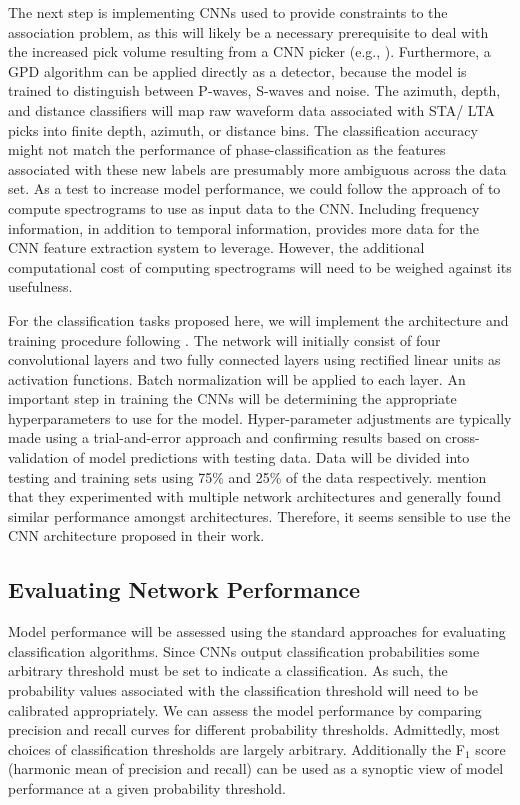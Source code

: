\documentclass[12p]{article}
\begin{document}
The next step is implementing CNNs used to provide constraints to the association problem, as this will likely be a
necessary prerequisite to deal with the increased pick volume resulting from a CNN picker (e.g., \citep{Perol2018}).
Furthermore, a GPD algorithm can be applied directly as a detector, because the model is trained to distinguish between
P-waves, S-waves and noise. The azimuth, depth, and distance classifiers will map raw waveform data associated with STA/
LTA picks into finite depth, azimuth, or distance bins. The classification accuracy might not match the performance of
phase-classification as the features associated with these new labels are presumably more ambiguous across the data
set. As a test to increase model performance, we could follow the approach of \citet{Zhu2019b} to compute spectrograms
to use as input data to the CNN. Including frequency information, in addition to temporal information, provides more
data for the CNN feature extraction system to leverage. However, the additional computational cost of computing
spectrograms will need to be weighed against its usefulness.

For the classification tasks proposed here, we will implement the architecture and training procedure following
\citet{Ross2018b}. The network will initially consist of four convolutional layers and two fully connected layers using
rectified  linear units as activation functions. Batch normalization will be applied to each layer. An important step in
training the CNNs will be determining the appropriate hyperparameters to use for the model. Hyper-parameter adjustments
are typically made using a trial-and-error approach and confirming results based on cross-validation of model
predictions with testing data. Data will be divided into testing and training sets using 75\% and 25\% of the data
respectively. \citet{Ross2018b} mention that they experimented with multiple network architectures and generally found
similar performance amongst architectures. Therefore, it seems sensible to use the CNN architecture proposed in their
work.

\subsection{Evaluating Network Performance}

Model performance will be assessed using the standard approaches for evaluating classification algorithms. Since CNNs
output classification probabilities some arbitrary threshold must be set to indicate a classification. As such, the
probability values associated with the classification threshold will need to be calibrated appropriately. We can assess
the model performance by comparing precision and recall curves for different probability thresholds. Admittedly, most
choices of classification thresholds are largely arbitrary. Additionally the F$_1$ score (harmonic mean of precision and
recall) can be used as a synoptic view of model performance at a given probability threshold.
\end{document}
